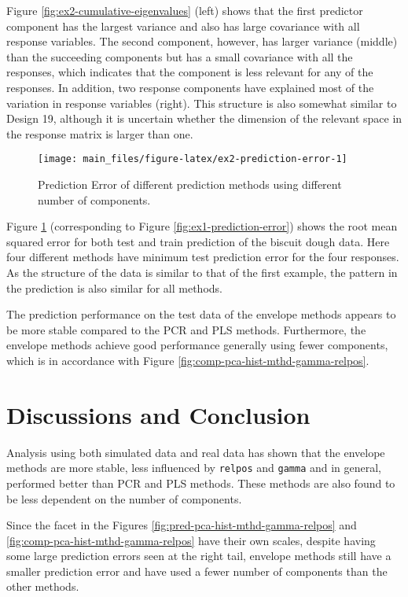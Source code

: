 \documentclass[review]{elsarticle}
\begin{document}
Figure \ref{fig:ex2-cumulative-eigenvalues} (left) shows that the first
predictor component has the largest variance and also has large
covariance with all response variables. The second component, however,
has larger variance (middle) than the succeeding components but has a
small covariance with all the responses, which indicates that the
component is less relevant for any of the responses. In addition, two
response components have explained most of the variation in response
variables (right). This structure is also somewhat similar to Design 19,
although it is uncertain whether the dimension of the relevant space in
the response matrix is larger than one.

\begin{figure}[!htb]
\texttt{[image: main\_files/figure-latex/ex2-prediction-error-1]} \caption{Prediction Error of different prediction methods using different number of components.}\label{fig:ex2-prediction-error}
\end{figure}

Figure \ref{fig:ex2-prediction-error} (corresponding to Figure
\ref{fig:ex1-prediction-error}) shows the root mean squared error for
both test and train prediction of the biscuit dough data. Here four
different methods have minimum test prediction error for the four
responses. As the structure of the data is similar to that of the first
example, the pattern in the prediction is also similar for all methods.

The prediction performance on the test data of the envelope methods
appears to be more stable compared to the PCR and PLS methods.
Furthermore, the envelope methods achieve good performance generally
using fewer components, which is in accordance with Figure
\ref{fig:comp-pca-hist-mthd-gamma-relpos}.

\section{Discussions and Conclusion}\label{discussions-and-conclusion}

Analysis using both simulated data and real data has shown that the
envelope methods are more stable, less influenced by \texttt{relpos} and
\texttt{gamma} and in general, performed better than PCR and PLS
methods. These methods are also found to be less dependent on the number
of components.

Since the facet in the Figures \ref{fig:pred-pca-hist-mthd-gamma-relpos}
and \ref{fig:comp-pca-hist-mthd-gamma-relpos} have their own scales,
despite having some large prediction errors seen at the right tail,
envelope methods still have a smaller prediction error and have used a
fewer number of components than the other methods.
\end{document}
